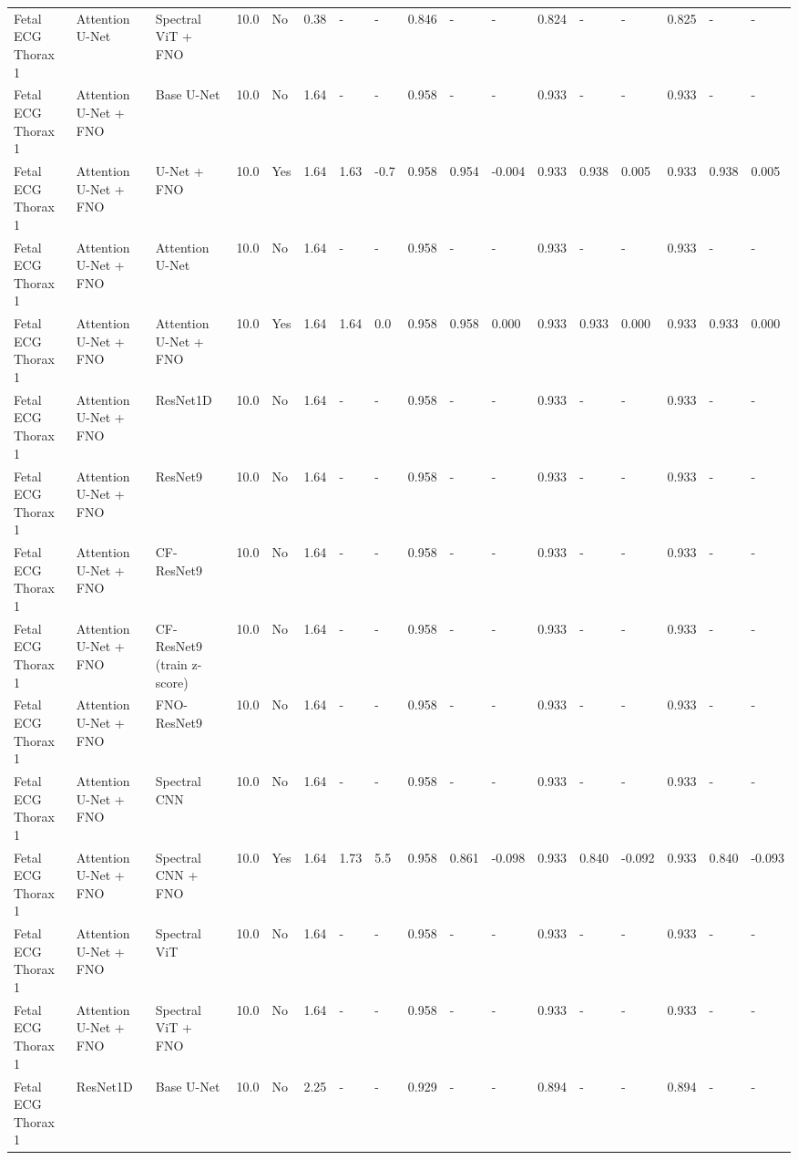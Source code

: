 \begin{longtable}{lllllllllllllllll}
Fetal ECG Thorax 1 & Attention U-Net & Spectral ViT + FNO & 10.0 & No & 0.38 & - & - & 0.846 & - & - & 0.824 & - & - & 0.825 & - & - \\
Fetal ECG Thorax 1 & Attention U-Net + FNO & Base U-Net & 10.0 & No & 1.64 & - & - & 0.958 & - & - & 0.933 & - & - & 0.933 & - & - \\
Fetal ECG Thorax 1 & Attention U-Net + FNO & U-Net + FNO & 10.0 & Yes & 1.64 & 1.63 & -0.7 & 0.958 & 0.954 & -0.004 & 0.933 & 0.938 & 0.005 & 0.933 & 0.938 & 0.005 \\
Fetal ECG Thorax 1 & Attention U-Net + FNO & Attention U-Net & 10.0 & No & 1.64 & - & - & 0.958 & - & - & 0.933 & - & - & 0.933 & - & - \\
Fetal ECG Thorax 1 & Attention U-Net + FNO & Attention U-Net + FNO & 10.0 & Yes & 1.64 & 1.64 & 0.0 & 0.958 & 0.958 & 0.000 & 0.933 & 0.933 & 0.000 & 0.933 & 0.933 & 0.000 \\
Fetal ECG Thorax 1 & Attention U-Net + FNO & ResNet1D & 10.0 & No & 1.64 & - & - & 0.958 & - & - & 0.933 & - & - & 0.933 & - & - \\
Fetal ECG Thorax 1 & Attention U-Net + FNO & ResNet9 & 10.0 & No & 1.64 & - & - & 0.958 & - & - & 0.933 & - & - & 0.933 & - & - \\
Fetal ECG Thorax 1 & Attention U-Net + FNO & CF-ResNet9 & 10.0 & No & 1.64 & - & - & 0.958 & - & - & 0.933 & - & - & 0.933 & - & - \\
Fetal ECG Thorax 1 & Attention U-Net + FNO & CF-ResNet9 (train z-score) & 10.0 & No & 1.64 & - & - & 0.958 & - & - & 0.933 & - & - & 0.933 & - & - \\
Fetal ECG Thorax 1 & Attention U-Net + FNO & FNO-ResNet9 & 10.0 & No & 1.64 & - & - & 0.958 & - & - & 0.933 & - & - & 0.933 & - & - \\
Fetal ECG Thorax 1 & Attention U-Net + FNO & Spectral CNN & 10.0 & No & 1.64 & - & - & 0.958 & - & - & 0.933 & - & - & 0.933 & - & - \\
Fetal ECG Thorax 1 & Attention U-Net + FNO & Spectral CNN + FNO & 10.0 & Yes & 1.64 & 1.73 & 5.5 & 0.958 & 0.861 & -0.098 & 0.933 & 0.840 & -0.092 & 0.933 & 0.840 & -0.093 \\
Fetal ECG Thorax 1 & Attention U-Net + FNO & Spectral ViT & 10.0 & No & 1.64 & - & - & 0.958 & - & - & 0.933 & - & - & 0.933 & - & - \\
Fetal ECG Thorax 1 & Attention U-Net + FNO & Spectral ViT + FNO & 10.0 & No & 1.64 & - & - & 0.958 & - & - & 0.933 & - & - & 0.933 & - & - \\
Fetal ECG Thorax 1 & ResNet1D & Base U-Net & 10.0 & No & 2.25 & - & - & 0.929 & - & - & 0.894 & - & - & 0.894 & - & - \\

\end{longtable}
